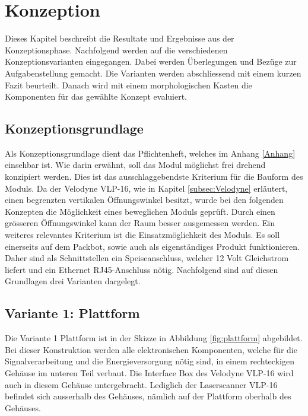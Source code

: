 \chapter{Konzeption}
\label{chap:Konzeption}
Dieses Kapitel beschreibt die Resultate und Ergebnisse aus der Konzeptionsphase. Nachfolgend werden auf die verschiedenen Konzeptionsvarianten eingegangen. Dabei werden Überlegungen und Bezüge zur Aufgabenstellung gemacht. Die Varianten werden abschliessend mit einem kurzen Fazit beurteilt. Danach wird mit einem morphologischen Kasten die Komponenten für das gewählte Konzept evaluiert. 

\section{Konzeptionsgrundlage}
\label{sec:Konzeptiongrund}
Als Konzeptionsgrundlage dient das Pflichtenheft, welches im Anhang \ref{Anhang} einsehbar ist. Wie darin erwähnt, soll das Modul möglichst frei drehend konzipiert werden. Dies ist das ausschlaggebendste Kriterium für die Bauform des Moduls. Da der Velodyne VLP-16, wie in Kapitel \ref{subsec:Velodyne} erläutert, einen begrenzten vertikalen Öffnungswinkel besitzt, wurde bei den folgenden Konzepten die Möglichkeit eines beweglichen Moduls geprüft. Durch einen grösseren Öffnungswinkel kann der Raum besser ausgemessen werden. Ein weiteres relevantes Kriterium ist die Einsatzmöglichkeit des Moduls. Es soll einerseits auf dem Packbot, sowie auch als eigenständiges Produkt funktionieren. Daher sind als Schnittstellen ein Speiseanschluss, welcher 12 Volt Gleichstrom liefert und ein Ethernet RJ45-Anschluss nötig. Nachfolgend sind auf diesen Grundlagen drei Varianten dargelegt.

\section {Variante 1: Plattform}
\label{sec:var1}
Die Variante 1 Plattform ist in der Skizze in Abbildung \ref{fig:plattform} abgebildet. Bei dieser Konstruktion werden alle elektronischen Komponenten, welche für die Signalverarbeitung und die Energieversorgung nötig sind, in einem rechteckigen Gehäuse im unteren Teil verbaut. Die Interface Box des Velodyne VLP-16 wird auch in diesem Gehäuse untergebracht. Lediglich der Laserscanner VLP-16 befindet sich ausserhalb des Gehäuses, nämlich auf der Plattform oberhalb des Gehäuses.

